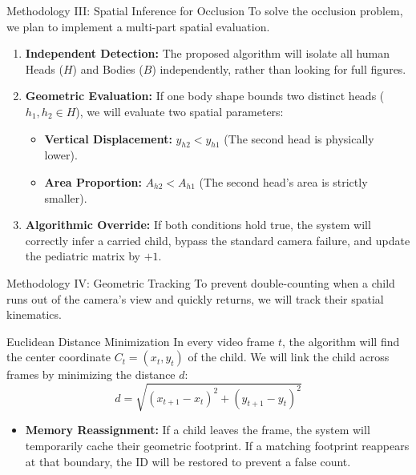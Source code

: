 \documentclass[11pt, aspectratio=169]{beamer}
\begin{document}
\begin{frame}{Methodology III: Spatial Inference for Occlusion}
    To solve the occlusion problem, we plan to implement a multi-part spatial evaluation.

    \vspace{0.2cm}
    \begin{enumerate}
        \item \textbf{Independent Detection:} The proposed algorithm will isolate all human Heads ($H$) and Bodies ($B$) independently, rather than looking for full figures.
        \item \textbf{Geometric Evaluation:} If one body shape bounds two distinct heads ($h_1, h_2 \in H$), we will evaluate two spatial parameters:
        \begin{itemize}
            \item \textbf{Vertical Displacement:} $y_{h2} < y_{h1}$ (The second head is physically lower).
            \item \textbf{Area Proportion:} $A_{h2} < A_{h1}$ (The second head's area is strictly smaller).
        \end{itemize}
        \item \textbf{Algorithmic Override:} If both conditions hold true, the system will correctly infer a carried child, bypass the standard camera failure, and update the pediatric matrix by $+1$.
    \end{enumerate}
\end{frame}

\begin{frame}{Methodology IV: Geometric Tracking}
    To prevent double-counting when a child runs out of the camera's view and quickly returns, we will track their spatial kinematics.

    \begin{block}{Euclidean Distance Minimization}
        In every video frame $t$, the algorithm will find the center coordinate $C_t = (x_t, y_t)$ of the child. We will link the child across frames by minimizing the distance $d$:
        \begin {equation}d = \sqrt{(x_{t+1} - x_t)^2 + (y_{t+1} - y_t)^2}\end {equation}
    \end{block}

    \vspace{0.2cm}
    \begin{itemize}
        \item \textbf{Memory Reassignment:} If a child leaves the frame, the system will temporarily cache their geometric footprint. If a matching footprint reappears at that boundary, the ID will be restored to prevent a false count.
    \end{itemize}
\end{frame}
\end{document}
